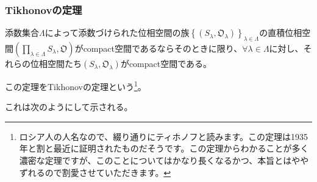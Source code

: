 \documentclass[dvipdfmx]{jsarticle}
\begin{document}
\subsubsection{Tikhonovの定理}%
\begin{thm}\label{8.1.6.7}
添数集合$\varLambda$によって添数づけられた位相空間の族$\left\{ \left( S_{\lambda},\mathfrak{O}_{\lambda} \right) \right\}_{\lambda \in \varLambda}$の直積位相空間$\left( \prod_{\lambda \in \varLambda} S_{\lambda},\mathfrak{O} \right)$がcompact空間であるならそのときに限り、$\forall\lambda \in \varLambda$に対し、それらの位相空間たち$\left( S_{\lambda},\mathfrak{O}_{\lambda} \right)$がcompact空間である。\par
この定理をTikhonovの定理という\footnote{ロシア人の人名なので、綴り通りにティホノフと読みます。この定理は1935年と割と最近に証明されたものだそうです。この定理からわかることが多く濃密な定理ですが、このことについてはかなり長くなるかつ、本旨とはややずれるので割愛させていただきます。}。
\end{thm}\par
これは次のようにして示される。
\end{document}
